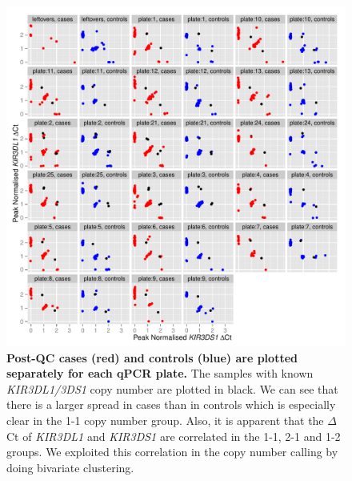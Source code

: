 \begin{figure}[h]
    \centering
        \includegraphics[scale=.9] {KIR/figures/Figure-S2.pdf}
    \caption{
        \label{Figure-S2}
        \textbf{Post-QC cases (red) and controls (blue) are plotted separately for each qPCR plate.}
        The samples with known \emph{KIR3DL1/3DS1} copy number are plotted in black.
        We can see that there is a larger spread in cases than in controls which is especially clear in the 1-1 copy number group.
        Also, it is apparent that the $\Delta$Ct of \emph{KIR3DL1} and \emph{KIR3DS1} are correlated in the 1-1, 2-1 and 1-2 groups.
        We exploited this correlation in the copy number calling by doing bivariate clustering.
    }
\end{figure}



